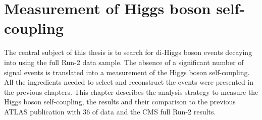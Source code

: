 \chapter{Measurement of Higgs boson self-coupling}
\label{HHyybb}

The central subject of this thesis is to search for di-Higgs boson events decaying into \HHyybb using the full Run-2 data sample. The absence of a significant number of signal events is translated into a measurement of the Higgs boson self-coupling. All the ingredients needed to select and reconstruct the \HHyybb events were presented in the previous chapters. This chapter describes the analysis strategy to measure the Higgs boson self-coupling, the results and their comparison to the previous ATLAS publication with 36 \ifb of data and the CMS full Run-2 results.  

